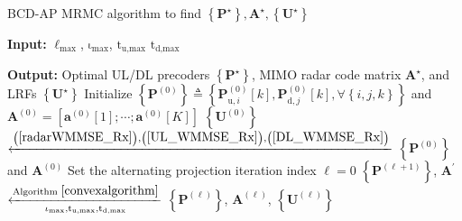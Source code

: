 \documentclass[9pt,journal]{IEEEtran}
\newcommand{\paren}[1]{\left({#1}\right)}
\newcommand{\bracket}[1]{{\left [{#1}\right ]}}
\newcommand{\braces}[1]{{\left\{ {#1}\right\}}}
\newcommand{\rr}{_\mathrm{r}}
\newcommand{\B}{\textrm{B}}
\newcommand{\rnr}{_{\mathrm{r},n_\mathrm{r}}}
\newcommand{\HrB}{\mathbf{H}_{\textrm{rB}}}
\newcommand{\Hrj}{\mathbf{H}_{\textrm{r},j}}
\newcommand{\HBj}{\mathbf{H}_{\textrm{B},j}}
\newcommand{\HiB}{\mathbf{H}_{i,\textrm{B}}}
\theoremstyle{definition}
\begin{document}
	\begin{algorithm}[ht!]
	    \caption{BCD-AP MRMC algorithm to find $\braces{\mathbf{P}^\star},\mathbf{A}^\star,\braces{\mathbf{U}^\star}$}
		\label{Alternating_sum}
		\begin{algorithmic}[1]
			\Statex \textbf{Input:} $\mathrm{\ell}_{\textrm{max}}$, $\mathrm{\iota}_{\textrm{max}}$, $\mathrm{t}_{\textrm{u,max}}$ $\mathrm{t}_{\textrm{d,max}}$
			
			\Statex \textbf{Output:} Optimal UL/DL precoders $\braces{\mathbf{P}^\star}$, MIMO radar code matrix $\mathbf{A}^\star$, and LRFs $\braces{\mathbf{U}^\star}$
			\State Initialize $\braces{\mathbf{P}^{\paren{\mathrm{0}}}}\triangleq
			\braces{\mathbf{P}^{\paren{\mathrm{0}}}_{\textrm{u},i}\bracket{k},\mathbf{P}^{\paren{\mathrm{0}}}_{\textrm{d},j}\bracket{k}, \forall \braces{i,j,k}}$ and $\mathbf{A}^{\paren{\mathrm{0}}}=\bracket{\mathbf{a}^{\paren{\mathrm{0}}}\bracket{1};\cdots;\mathbf{a}^{\paren{\mathrm{0}}}\bracket{\mathrm{\mathit{K}}}}$
			\State %
			$\braces{\mathbf{U}^{\paren{\mathrm{0}}}}$ $\xleftarrow{\mathrm{\paren{\ref{radarWMMSE_Rx}}},\mathrm{\paren{\ref{UL_WMMSE_Rx}}},\mathrm{\paren{\ref{DL_WMMSE_Rx}}}}$  $\braces{\mathbf{P}^{\paren{\mathrm{0}}}}$ and $\mathbf{A}^{\paren{\mathrm{0}}}$ 
			\State Set the alternating projection iteration index $\mathrm{\ell=0}$
			\Repeat \; 
			\State $\braces{\mathbf{P}^{\paren{\mathrm{\ell+1}}}}$, $\mathbf{A}^\prime$ $\xleftarrow[\mathrm{\iota}_{\textrm{max}},\mathrm{t}_{\textrm{u,max}},\mathrm{t}_{\textrm{d,max}}]{\textrm{Algorithm }\ref{convexalgorithm}}$ $\braces{\mathbf{P}^{\paren{\mathrm{\ell}}}}$, $\mathbf{A}^{\paren{\mathrm{\ell}}}$, $\braces{\mathbf{U}^{\paren{\mathrm{\ell}}}}$  %

\end{algorithmic}
\end{algorithm}
\end{document}
